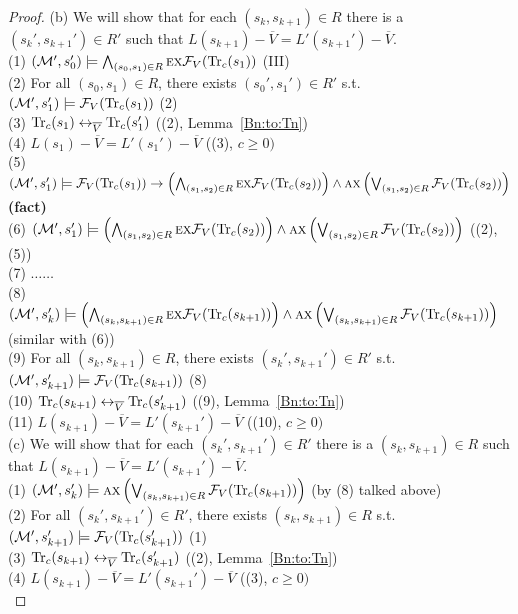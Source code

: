\documentclass{article}
\begin{document}
\begin{proof}
         (b) We will show that for each $(s_k, s_{k+1}) \in R$ there is a $(s_k', s_{k+1}') \in R'$ such that $L(s_{k+1}) - \overline V = L'(s_{k+1}') - \overline V$.\\
         (1) $({\cal M}', s_0') \models \bigwedge_{(s_0, s_1) \in R} \textsc{e} \textsc{x} {\cal F}_V(\textrm{Tr}_c(s_1))$  \hfill  (III)\\
         (2) For all $(s_0, s_1) \in R$, there exists $(s_0', s_1') \in R'$ s.t.\ $({\cal M}', s_1') \models {\cal F}_V(\textrm{Tr}_c(s_1))$  \hfill  (2)\\
         (3) $\textrm{Tr}_c(s_1) \leftrightarrow_{\overline V} \textrm{Tr}_c(s_1')$  \hfill  ((2), Lemma~\ref{Bn:to:Tn}) \\
         (4) $L(s_1) - \overline V = L'(s_1') - \overline V$  \hfill   ((3), $c \geq 0)$\\
         (5) $({\cal M}', s_1') \models {\cal F}_V(\textrm{Tr}_c(s_1)) \rightarrow \left(\bigwedge_{(s_1,s_2)\in R} \textsc{e} \textsc{x} {\cal F}_V(\textrm{Tr}_c(s_2))\right) \wedge \textsc{a} \textsc{x} \left(\bigvee_{(s_1,s_2)\in R} {\cal F}_V(\textrm{Tr}_c(s_2))\right)$     \hfill  \textbf{(fact)}\\
         (6) $({\cal M}', s_1') \models \left(\bigwedge_{(s_1,s_2)\in R} \textsc{e} \textsc{x} {\cal F}_V(\textrm{Tr}_c(s_2))\right) \wedge \textsc{a} \textsc{x} \left(\bigvee_{(s_1,s_2)\in R} {\cal F}_V(\textrm{Tr}_c(s_2))\right)$ \hfill ((2), (5))\\
         (7) $\dots \dots$ \\
         (8) $({\cal M}', s_k') \models \left(\bigwedge_{(s_k,s_{k+1})\in R} \textsc{e} \textsc{x} {\cal F}_V(\textrm{Tr}_c(s_{k+1}))\right) \wedge \textsc{a} \textsc{x} \left(\bigvee_{(s_k,s_{k+1})\in R} {\cal F}_V(\textrm{Tr}_c(s_{k+1}))\right)$       \hfill (similar with (6))\\
         (9) For all $(s_k, s_{k+1}) \in R$, there exists $(s_k', s_{k+1}') \in R'$ s.t.\ $({\cal M}', s_{k+1}') \models {\cal F}_V(\textrm{Tr}_c(s_{k+1}))$  \hfill  (8)\\
         (10) $\textrm{Tr}_c(s_{k+1}) \leftrightarrow_{\overline V} \textrm{Tr}_c(s_{k+1}')$    \hfill ((9), Lemma~\ref{Bn:to:Tn}) \\
         (11) $L(s_{k+1}) - \overline V = L'(s_{k+1}') - \overline V$  \hfill   ((10), $c \geq 0)$\\

         (c) We will show that for each $(s_k', s_{k+1}') \in R'$ there is a $(s_k, s_{k+1})\in R$ such that $L(s_{k+1}) - \overline V = L'(s_{k+1}') - \overline V$.\\
         (1) $({\cal M}', s_k') \models \textsc{a} \textsc{x} \left(\bigvee_{(s_k,s_{k+1})\in R} {\cal F}_V(\textrm{Tr}_c(s_{k+1}))\right)$  \hfill (by (8) talked above)\\
         (2) For all $(s_k', s_{k+1}') \in R'$, there exists $(s_k, s_{k+1}) \in R$ s.t.\ $({\cal M}', s_{k+1}') \models {\cal F}_V(\textrm{Tr}_c(s_{k+1}'))$  \hfill (1) \\
         (3) $\textrm{Tr}_c(s_{k+1}) \leftrightarrow_{\overline V} \textrm{Tr}_c(s_{k+1}')$    \hfill ((2), Lemma~\ref{Bn:to:Tn}) \\
         (4) $L(s_{k+1}) - \overline V = L'(s_{k+1}') - \overline V$  \hfill   ((3), $c \geq 0)$\\


\end{proof}
\end{document}
